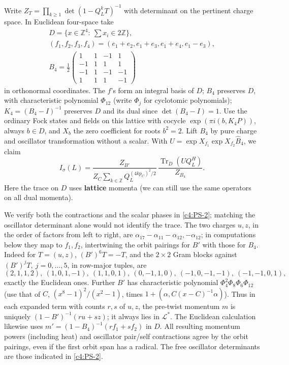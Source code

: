 Write \(Z_T=\prod_{k\ge1}\det(1-Q_L^k T)^{-1}\) with determinant on the pertinent charge space. In Euclidean four-space take
\[
\begin{gathered}
 D=\{x\in\mathbb Z^4:\ \sum x_i\in 2\mathbb Z\},\\
 (f_1,f_2,f_3,f_4)=(e_1+e_2,e_1+e_3,e_1+e_4,e_1-e_3),\\
 B_4=\tfrac12\begin{pmatrix}1&1&-1&1\\-1&1&1&1\\-1&1&-1&-1\\1&1&1&-1\end{pmatrix}
\end{gathered}
\]
in orthonormal coordinates. The \(f\)'s form an integral basis of \(D\); \(B_4\) preserves \(D\), with characteristic polynomial \(\Phi_{12}\) (write \(\Phi_j\) for cyclotomic polynomials); \(K_4=(B_4-I)^{-1}\) preserves \(D\) and its dual since \(\det(B_4-I)=1\). Use the ordinary Fock states and fields on this lattice with cocycle \(\exp(\pi i(b,K_4P))\), always \(b\in D\), and \(X_b\) the zero coefficient for roots \(b^2=2\). Lift \(B_4\) by pure charge and oscillator transformation without a scalar. With \(U=\exp X_{f_1}\exp X_{f_2}\widehat B_4\), we claim
\begin{equation}
 I_\sigma(L)=
 \frac{Z_{B'}}{Z_C\sum_{k\in\mathbb Z}Q_L^{(4kp_C)^2/2}}\,
              \frac{\operatorname{Tr}_{D}(UQ_L^H)}{Z_{B_4}} .           \label{c4:PS-2}
\end{equation}
Here the trace on \(D\) uses \textbf{lattice} momenta (we can still use the same operators on all dual momenta).

We verify both the contractions and the scalar phases in
\eqref{c4:PS-2}; matching the oscillator determinant alone would not
identify the trace. The two charges \(u,z\), in the order of factors from left to right, are \(\alpha_{17}-\alpha_{11}-\alpha_{12},-\alpha_{12}\); in computations below they map to \(f_1,f_2\), intertwining the orbit pairings for \(B'\) with those for \(B_4\). Indeed for \(T=(u,z)\),
\((B')^6 T=-T\), and the \(2\times2\) Gram blocks against \((B')^j T,\ j=0,\ldots,5\), in row-major tuples, are
\[
 (2,1,1,2),\ (1,0,1,-1),\ (1,1,0,1),\ (0,-1,1,0),\
 (-1,0,-1,-1),\ (-1,-1,0,1),
\]
exactly the Euclidean ones. Further \(B'\) has characteristic polynomial
\(\Phi_4^2\Phi_8\Phi_6\Phi_{12}\) (use that of \(C\), \((x^8-1)^2/(x^2-1)\), times \(1+(\alpha,C(x-C)^{-1}\alpha)\)). Thus in each expanded term with counts \(r,s\) of \(u,z\), the pre-twist momentum \(m\) is uniquely \((1-B')^{-1}(r u+s z)\); it always lies in \(\mathcal L^*\). The Euclidean calculation likewise uses \(m'=(1-B_4)^{-1}(r f_1+s f_2)\) in \(D\). All resulting momentum powers (including heat) and oscillator pair/self contractions agree by the orbit pairings, even if the first orbit span has a radical. The free oscillator determinants are those indicated in \eqref{c4:PS-2}.

